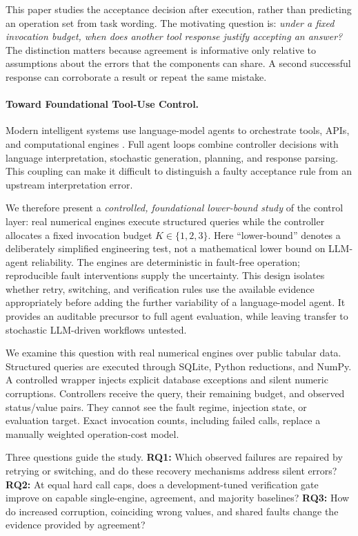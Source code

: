 \documentclass{svproc}
\begin{document}
This paper studies the acceptance decision after execution, rather than predicting an operation set from task wording. The motivating question is: \emph{under a fixed invocation budget, when does another tool response justify accepting an answer?} The distinction matters because agreement is informative only relative to assumptions about the errors that the components can share. A second successful response can corroborate a result or repeat the same mistake.

\paragraph{Toward Foundational Tool-Use Control.}
Modern intelligent systems use language-model agents to orchestrate tools, APIs, and computational engines \cite{yao2023react,xiang2026scheduler}. Full agent loops combine controller decisions with language interpretation, stochastic generation, planning, and response parsing. This coupling can make it difficult to distinguish a faulty acceptance rule from an upstream interpretation error.

We therefore present a \emph{controlled, foundational lower-bound study} of the control layer: real numerical engines execute structured queries while the controller allocates a fixed invocation budget $K\in\{1,2,3\}$. Here ``lower-bound'' denotes a deliberately simplified engineering test, not a mathematical lower bound on LLM-agent reliability. The engines are deterministic in fault-free operation; reproducible fault interventions supply the uncertainty. This design isolates whether retry, switching, and verification rules use the available evidence appropriately before adding the further variability of a language-model agent. It provides an auditable precursor to full agent evaluation, while leaving transfer to stochastic LLM-driven workflows untested.

We examine this question with real numerical engines over public tabular data. Structured queries are executed through SQLite, Python reductions, and NumPy. A controlled wrapper injects explicit database exceptions and silent numeric corruptions. Controllers receive the query, their remaining budget, and observed status/value pairs. They cannot see the fault regime, injection state, or evaluation target. Exact invocation counts, including failed calls, replace a manually weighted operation-cost model.

Three questions guide the study. \textbf{RQ1:} Which observed failures are repaired by retrying or switching, and do these recovery mechanisms address silent errors? \textbf{RQ2:} At equal hard call caps, does a development-tuned verification gate improve on capable single-engine, agreement, and majority baselines? \textbf{RQ3:} How do increased corruption, coinciding wrong values, and shared faults change the evidence provided by agreement?
\end{document}
